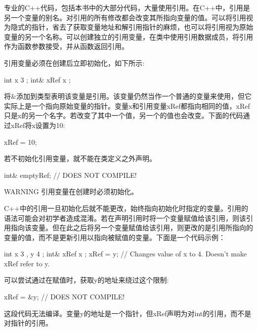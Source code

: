
专业的C++代码，包括本书中的大部分代码，大量使用引用。在C++中，引用是另一个变量的别名。对引用的所有修改都会改变其所指向变量的值。可以将引用视为隐式的指针，省去了获取变量地址和解引用指针的麻烦，也可以将引用视为原始变量的另一个名称。可以创建独立的引用变量，在类中使用引用数据成员，将引用作为函数参数接受，并从函数返回引用。


引用变量必须在创建后立即初始化，如下所示:

\begin{cpp}
int x { 3 };
int& xRef { x };
\end{cpp}

将\&添加到类型表明该变量是引用。该变量仍然当作一个普通的变量来使用，但它实际上是一个指向原始变量的指针。变量x和引用变量xRef都指向相同的值，xRef只是x的另一个名字。若改变了其中一个值，另一个的值也会改变。下面的代码通过xRef将x设置为10:

\begin{cpp}
xRef = 10;
\end{cpp}

若不初始化引用变量，就不能在类定义之外声明。

\begin{cpp}
int& emptyRef; // DOES NOT COMPILE!
\end{cpp}

\begin{myWarning}{WARNING}
引用变量在创建时必须初始化。
\end{myWarning}


C++中的引用一旦初始化后就不能更改，始终指向初始化时指定的变量。引用的语法可能会对初学者造成混淆。若在声明引用时将一个变量赋值给该引用，则该引用指向该变量。但在此之后将另一个变量赋值给该引用，则更改的是引用所指向的变量的值，而不是更新引用以指向被赋值的变量。下面是一个代码示例：

\begin{cpp}
int x { 3 }, y { 4 };
int& xRef { x };
xRef = y; // Changes value of x to 4. Doesn't make xRef refer to y.
\end{cpp}

可以尝试通过在赋值时，获取y的地址来绕过这个限制:

\begin{cpp}
xRef = &y; // DOES NOT COMPILE!
\end{cpp}

这段代码无法编译。变量y的地址是一个指针，但xRef声明为对int的引用，而不是对指针的引用。

